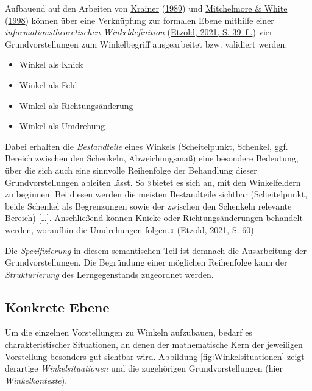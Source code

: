\documentclass[
  ngerman,
]{scrbook}
\providecommand{\tightlist}{%
  \setlength{\itemsep}{0pt}\setlength{\parskip}{0pt}}
\theoremstyle{definition}
\theoremstyle{definition}
\theoremstyle{definition}
\theoremstyle{definition}
\theoremstyle{remark}
\begin{document}
Aufbauend auf den Arbeiten von \protect\hyperlink{ref-Krainer:1989}{Krainer} (\protect\hyperlink{ref-Krainer:1989}{1989}) und \protect\hyperlink{ref-Mitchelmore:1998}{Mitchelmore \& White} (\protect\hyperlink{ref-Mitchelmore:1998}{1998}) können über eine Verknüpfung zur formalen Ebene mithilfe einer \emph{informationstheoretischen Winkeldefinition} (\protect\hyperlink{ref-Etzold2021}{Etzold, 2021, S. 39~f..}) vier Grundvorstellungen zum Winkelbegriff ausgearbeitet bzw. validiert werden:

\begin{itemize}
\tightlist
\item
  Winkel als Knick
\item
  Winkel als Feld
\item
  Winkel als Richtungsänderung
\item
  Winkel als Umdrehung
\end{itemize}

Dabei erhalten die \emph{Bestandteile} eines Winkels (Scheitelpunkt, Schenkel, ggf. Bereich zwischen den Schenkeln, Abweichungsmaß) eine besondere Bedeutung, über die sich auch eine sinnvolle Reihenfolge der Behandlung dieser Grundvorstellungen ableiten lässt. So »bietet es sich an, mit den Winkelfeldern zu beginnen. Bei diesen werden die meisten Bestandteile sichtbar (Scheitelpunkt, beide Schenkel als Begrenzungen sowie der zwischen den Schenkeln relevante Bereich) {[}\ldots{]}. Anschließend können Knicke oder Richtungsänderungen behandelt werden, woraufhin die Umdrehungen folgen.« (\protect\hyperlink{ref-Etzold2021}{Etzold, 2021, S. 60})

Die \emph{Spezifizierung} in diesem semantischen Teil ist demnach die Ausarbeitung der Grundvorstellungen. Die Begründung einer möglichen Reihenfolge kann der \emph{Strukturierung} des Lerngegenstands zugeordnet werden.

\hypertarget{konkrete-ebene}{%
\subsection{Konkrete Ebene}\label{konkrete-ebene}}

Um die einzelnen Vorstellungen zu Winkeln aufzubauen, bedarf es charakteristischer Situationen, an denen der mathematische Kern der jeweiligen Vorstellung besonders gut sichtbar wird. Abbildung \ref{fig:Winkelsituationen} zeigt derartige \emph{Winkelsituationen} und die zugehörigen Grundvorstellungen (hier \emph{Winkelkontexte}).
\end{document}
